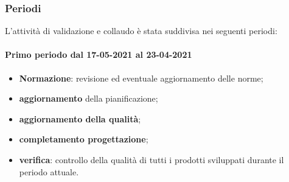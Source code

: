 \subsubsection{Periodi}
L'attività di validazione e collaudo è stata suddivisa nei seguenti periodi:
\paragraph{Primo periodo dal 17-05-2021 al 23-04-2021}
\begin{itemize}
	\item \textbf{Normazione}: revisione ed eventuale aggiornamento delle norme;
	\item \textbf{aggiornamento} della pianificazione;
	\item \textbf{aggiornamento della qualità};
	\item \textbf{completamento progettazione};
	\item \textbf{verifica}: controllo della qualità di tutti i prodotti sviluppati durante il periodo attuale.
\end{itemize}


